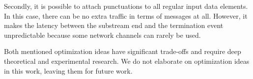 Secondly, it is possible to attach punctuations to all regular input data elements. In this case, there can be no extra traffic in terms of messages at all. However, it makes the latency between the substream end and the termination event unpredictable because some network channels can rarely be used.

Both mentioned optimization ideas have significant trade-offs and require deep theoretical and experimental research. We do not elaborate on optimization ideas in this work, leaving them for future work.
